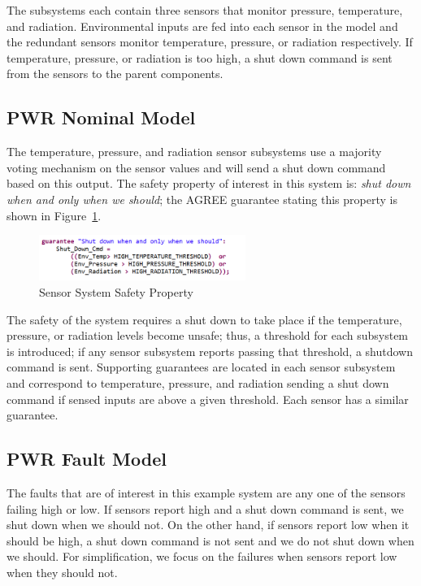 The subsystems each contain three sensors that monitor pressure, temperature, and radiation. Environmental inputs are fed into each sensor in the model and the redundant sensors monitor temperature, pressure, or radiation respectively. If temperature, pressure, or radiation is too high, a shut down command is sent from the sensors to the parent components. 

\subsection{PWR Nominal Model}
The temperature, pressure, and radiation sensor subsystems use a majority voting mechanism on the sensor values and will send a shut down command based on this output. The safety property of interest in this system is: \emph{shut down when and only when we should}; the AGREE guarantee stating this property is shown in Figure~\ref{fig:shutdownGuar}. 

\begin{figure}[h!]
	\begin{center}
		\includegraphics[width=0.6\textwidth]{images/sensorGuar.PNG}
	\end{center}
	\vspace{-2em}
	\caption{Sensor System Safety Property}
	\label{fig:shutdownGuar}
\end{figure}

The safety of the system requires a shut down to take place if the temperature, pressure, or radiation levels become unsafe; thus, a threshold for each subsystem is introduced; if any sensor subsystem reports passing that threshold, a shutdown command is sent. Supporting guarantees are located in each sensor subsystem and correspond to temperature, pressure, and radiation sending a shut down command if sensed inputs are above a given threshold. Each sensor has a similar guarantee. 

\subsection{PWR Fault Model}
The faults that are of interest in this example system are any one of the sensors failing high or low. If sensors report high and a shut down command is sent, we shut down when we should not. On the other hand, if sensors report low when it should be high, a shut down command is not sent and we do not shut down when we should. For simplification, we focus on the failures when sensors report low when they should not.

